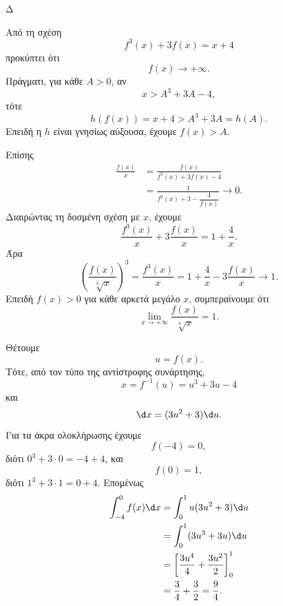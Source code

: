 \begin{thema}{Δ}
\begin{erwthma}
\item Από τη σχέση
\[
f^3(x)+3f(x)=x+4
\]
προκύπτει ότι
\[
f(x)\to+\infty.
\]
Πράγματι, για κάθε $A>0$, αν
\[
x>A^3+3A-4,
\]
τότε
\[
h(f(x))=x+4>A^3+3A=h(A).
\]
Επειδή η $h$ είναι γνησίως αύξουσα, έχουμε $f(x)>A$.

Επίσης
\begin{align*}
\frac{f(x)}{x}
&=\frac{f(x)}{f^3(x)+3f(x)-4}\\
&=\frac{1}{f^2(x)+3-\dfrac{4}{f(x)}}\longrightarrow 0.
\end{align*}
Διαιρώντας τη δοσμένη σχέση με $x$, έχουμε
\[
\frac{f^3(x)}{x}+3\frac{f(x)}{x}=1+\frac{4}{x}.
\]
Άρα
\[
\left(\frac{f(x)}{\sqrt[3]{x}}\right)^3
=\frac{f^3(x)}{x}
=1+\frac{4}{x}-3\frac{f(x)}{x}\longrightarrow 1.
\]
Επειδή $f(x)>0$ για κάθε αρκετά μεγάλο $x$, συμπεραίνουμε ότι
\[
{\lim_{x\to+\infty}\frac{f(x)}{\sqrt[3]{x}}=1}.
\]

\item Θέτουμε
\[
u=f(x).
\]
Τότε, από τον τύπο της αντίστροφης συνάρτησης,
\[
x=f^{-1}(u)=u^3+3u-4
\]
και
\[
\d x=(3u^2+3)\d u.
\]
Για τα άκρα ολοκλήρωσης έχουμε
\[
f(-4)=0,
\]
διότι $0^3+3\cdot0=-4+4$, και
\[
f(0)=1,
\]
διότι $1^3+3\cdot1=0+4$.
Επομένως
\begin{align*}
\int_{-4}^{0}f(x)\d x
&=\int_0^1 u(3u^2+3)\d u\\
&=\int_0^1(3u^3+3u)\d u\\
&=\left[\frac{3u^4}{4}+\frac{3u^2}{2}\right]_0^1\\
&=\frac{3}{4}+\frac{3}{2}
={\frac{9}{4}}.
\end{align*}
\end{erwthma}
\end{thema}

